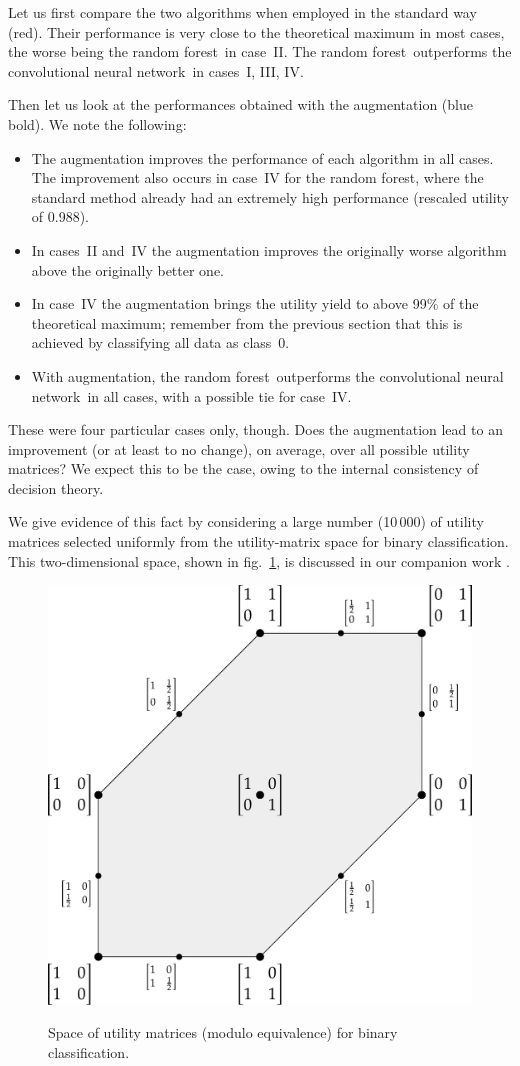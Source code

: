 \documentclass[\ifafour a4paper,12pt,\else a5paper,10pt,\fi%
onecolumn,oneside,article,%
british%
]{memoir}
\theoremstyle{remark}
\theoremstyle{innote}
\renewcommand*{\|}[1][]{\nonscript\:#1\vert\nonscript\:\mathopen{}}
\newcommand*{\sect}{\S}%
\newcommand*{\fig}{fig.}%
\newcommand*{\RF}{random forest}
\newcommand*{\CNN}{convolutional neural network}
\begin{document}
\medskip

Let us first compare the two algorithms when employed in the standard way (red). Their performance is very close to the theoretical maximum in most cases, the worse  being the \RF\ in case~II.  The \RF\ outperforms the \CNN\ in  cases~I, III, IV.

Then let us look at the performances obtained with the augmentation (blue bold). We note the following:
\begin{itemize}
\item The augmentation improves the performance of each algorithm in all cases. The improvement also occurs in case~IV for the \RF, where the standard method already had an extremely high performance (rescaled utility of 0.988).
\item In cases~II and~IV the augmentation improves the originally worse algorithm above the originally better one.
\item In case~IV the augmentation brings the utility yield to above 99\% of the theoretical maximum; remember from the previous section that this is achieved by classifying all data as class~0.
\item With augmentation, the \RF\ outperforms the \CNN\ in all cases, with a possible tie for case~IV.
\end{itemize}




\medskip

These were four particular cases only, though. Does the augmentation lead to an improvement (or at least to no change), on average, over all possible utility matrices? We expect this to be the case, owing to the internal consistency of decision theory.

We give evidence of this fact by considering a large number (10\,000) of utility matrices selected uniformly from the utility-matrix space for binary classification. This two-dimensional space, shown in \fig~\ref{fig:space_UM}, is discussed in our companion work \autocites[\sect~3.2]{dyrlandetal2022}.
\begin{figure}[t]
  \centering
  \includegraphics[width=0.5\linewidth]{space_UM2c.pdf}\\
  \caption{Space of utility matrices (modulo equivalence) for binary classification.}
  \label{fig:space_UM}
\end{figure}
\end{document}

